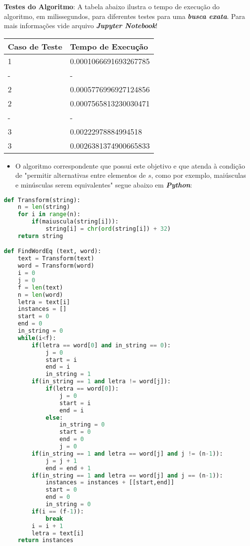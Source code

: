 \documentclass[paper=a4, fontsize=11pt]{scrartcl} %
\numberwithin{equation}{section} %
\numberwithin{figure}{section} %
\numberwithin{table}{section} %
\begin{document}
\pagebreak

\textbf{Testes do Algoritmo}: A tabela abaixo ilustra o tempo de execução do algoritmo, em milissegundos, para diferentes testes para uma \emph{\textbf{busca exata}}. Para mais informações vide arquivo \emph{\textbf{Jupyter Notebook}}!

\begin{table}[H]
\centering
\begin{tabular}{l|l}
Caso de Teste & Tempo de Execução \\\hline
1 & 0.0001066691693267785 \\
- & - \\
2 & 0.0005776996927124856 \\
2 & 0.0007565813230030471 \\
- & - \\
3 & 0.00222978884994518 \\
3 & 0.0026381374900665833
\end{tabular}
\end{table}

\begin{itemize}
   \item O algoritmo correspondente que possui este objetivo e que atenda à condição de "permitir alternativas entre elementos de $s$, como por exemplo, maiúsculas e minúsculas serem equivalentes" segue abaixo em \emph{\textbf{Python}}:
\end{itemize}

\begin{lstlisting}[language=Python, caption=String Python Algorithm]
def Transform(string):
    n = len(string)
    for i in range(n):
        if(maiuscula(string[i])):
            string[i] = chr(ord(string[i]) + 32)
    return string

def FindWordEq (text, word):
    text = Transform(text)
    word = Transform(word)
    i = 0
    j = 0
    f = len(text)
    n = len(word)
    letra = text[i]
    instances = []
    start = 0
    end = 0
    in_string = 0
    while(i<f):
        if(letra == word[0] and in_string == 0):
            j = 0
            start = i
            end = i
            in_string = 1
        if(in_string == 1 and letra != word[j]):
            if(letra == word[0]):
                j = 0
                start = i
                end = i
            else:
                in_string = 0
                start = 0
                end = 0
                j = 0            
        if(in_string == 1 and letra == word[j] and j != (n-1)):
            j = j + 1
            end = end + 1   
        if(in_string == 1 and letra == word[j] and j == (n-1)):
            instances = instances + [[start,end]]
            start = 0
            end = 0
            in_string = 0
        if(i == (f-1)):
            break
        i = i + 1
        letra = text[i]
    return instances
\end{lstlisting}
\end{document}
